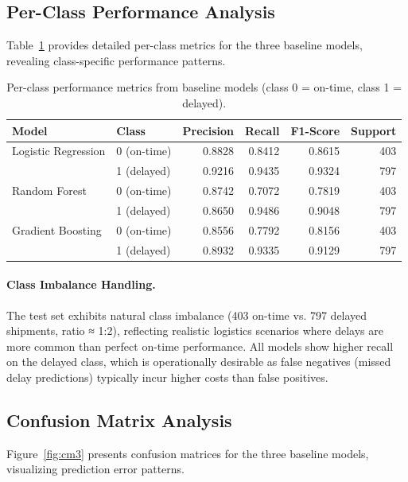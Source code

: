 \documentclass[11pt,a4paper]{article}
\begin{document}
\subsection{Per-Class Performance Analysis}

Table~\ref{tab:cls-json} provides detailed per-class metrics for the three baseline models, revealing class-specific performance patterns.

\begin{table}[H]
\centering
\caption{Per-class performance metrics from baseline models (class 0 = on-time, class 1 = delayed).}
\label{tab:cls-json}
\small
\begin{tabular}{llrrrr}
\toprule
\textbf{Model} & \textbf{Class} & \textbf{Precision} & \textbf{Recall} & \textbf{F1-Score} & \textbf{Support} \\
\midrule
Logistic Regression & 0 (on-time) & 0.8828 & 0.8412 & 0.8615 & 403 \\
                    & 1 (delayed) & 0.9216 & 0.9435 & 0.9324 & 797 \\
\midrule
Random Forest       & 0 (on-time) & 0.8742 & 0.7072 & 0.7819 & 403 \\
                    & 1 (delayed) & 0.8650 & 0.9486 & 0.9048 & 797 \\
\midrule
Gradient Boosting   & 0 (on-time) & 0.8556 & 0.7792 & 0.8156 & 403 \\
                    & 1 (delayed) & 0.8932 & 0.9335 & 0.9129 & 797 \\
\bottomrule
\end{tabular}
\end{table}

\paragraph{Class Imbalance Handling.}
The test set exhibits natural class imbalance (403 on-time vs. 797 delayed shipments, ratio ≈ 1:2), reflecting realistic logistics scenarios where delays are more common than perfect on-time performance. All models show higher recall on the delayed class, which is operationally desirable as false negatives (missed delay predictions) typically incur higher costs than false positives.

\subsection{Confusion Matrix Analysis}

Figure~\ref{fig:cm3} presents confusion matrices for the three baseline models, visualizing prediction error patterns.
\end{document}
